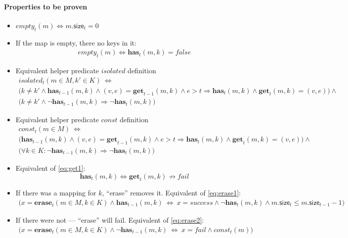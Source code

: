 \documentclass{article}
\renewcommand{\o}[1]{\ensuremath{\mathbf{#1}}}
\newcommand{\p}[1]{\ensuremath{\mathit{#1}}}
\newcommand{\s}[1]{\ensuremath{\mathsf{#1}}}
\begin{document}
\paragraph{Properties to be proven}
\begin{itemize}
\item $\p{empty}_t(m) \Leftrightarrow m.\s{size}_t=0$
\item If the map is empty, there no keys in it:
  \begin{gather*}
    \p{empty}_t(m) \Leftrightarrow \o{has}_t(m, k) = false
  \end{gather*}
\item Equivalent helper predicate \p{isolated} definition
  \begin{gather*}
    \p{isolated}_t(m\in M, k'\in K) ~\Leftrightarrow~\nonumber\\
    \Big(k\neq k' \wedge \o{has}_{t-1}(m, k) \wedge (v,e)=\o{get}_{t-1}(m, k) \wedge e>t \Rightarrow \o{has}_t(m, k) \wedge \o{get}_t(m, k)=(v,e)\Big)\wedge\nonumber\\
    \Big(k\neq k' \wedge \neg \o{has}_{t-1}(m, k) \Rightarrow \neg\o{has}_t(m, k)\Big)
  \end{gather*}
\item Equivalent helper predicate \p{const} definition
  \begin{gather*}
    \p{const}_t(m\in M) ~\Leftrightarrow~\nonumber\\
    \Big(\o{has}_{t-1}(m, k) \wedge (v,e)=\o{get}_{t-1}(m, k) \wedge e>t \Rightarrow \o{has}_t(m, k) \wedge \o{get}_t(m, k)=(v,e)\Big)\wedge\nonumber\\
    \Big(\forall k\in K: \neg \o{has}_{t-1}(m, k) \Rightarrow \neg\o{has}_t(m, k)\Big)
  \end{gather*}

\item Equivalent of \eqref{eq:get1}:
  \[
  \o{has}_t(m, k) \Leftrightarrow \o{get}_t(m, k) \not\rightarrow fail
  \]
\item If there was a mapping for $k$, ``erase'' removes it. Equivalent of \eqref{eq:erase1}:
  \begin{gather*}
    \Big(x=\o{erase}_t(m\in M, k\in K) \wedge \o{has}_{t-1}(m, k) ~\Leftrightarrow~ x=success \wedge \neg\o{has}_t(m, k) \wedge m.\s{size}_t \le m.\s{size}_{t-1}-1 \Big)
  \end{gather*}
\item If there were not --- ``erase'' will fail. Equivalent of \eqref{eq:erase2}:
  \begin{gather*}
    \Big(x=\o{erase}_t(m\in M, k\in K) \wedge \neg\o{has}_{t-1}(m, k) ~\Leftrightarrow~ x=fail\wedge \p{const}_t(m)\Big)
  \end{gather*}


\end{itemize}
\end{document}
